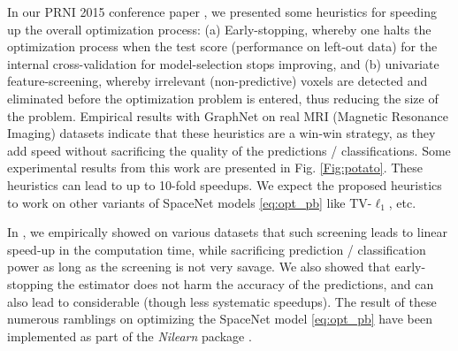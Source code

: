 In our PRNI 2015 conference paper  \citep{dohmatob2015speeding}, we presented some heuristics for speeding up the overall optimization process: (a) Early-stopping, whereby one  halts
the optimization process when the test score (performance on left-out
data) for the internal cross-validation for model-selection stops
improving, and (b) univariate feature-screening, whereby irrelevant
(non-predictive) voxels are detected and eliminated before the
optimization problem is entered, thus reducing the size of the
problem. Empirical results with GraphNet on real MRI (Magnetic
Resonance Imaging)
datasets indicate that these heuristics are a win-win strategy, as
they add speed without sacrificing the quality of the predictions
/ classifications. Some experimental results from this work are presented in
Fig. \ref{Fig:potato}.  These heuristics can lead to up to 10-fold speedups.
We expect the proposed heuristics to work on other variants of SpaceNet models \eqref{eq:opt_pb} like TV-$\ell_1$,
etc.

 In  \citep{dohmatob2015speeding}, we empirically showed on various
datasets that such screening leads to linear speed-up in the computation
time, while sacrificing prediction / classification power as long as the
screening is not very savage. We also showed that early-stopping the
estimator does not harm the accuracy of the predictions, and can also lead
to considerable (though less systematic speedups).
The result of these numerous ramblings on optimizing the SpaceNet model \eqref{eq:opt_pb} have been implemented as part of the \textit{Nilearn} package  \citep{nilearn}.





